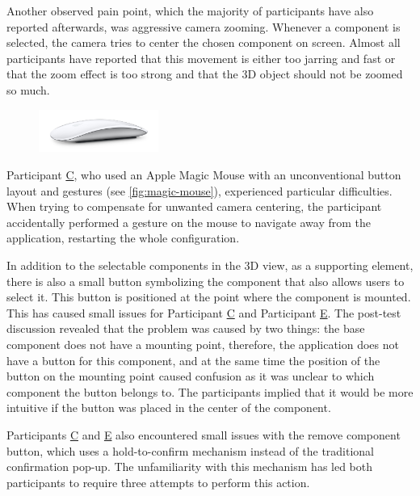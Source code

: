 Another observed pain point, which the majority of participants have also reported afterwards, was aggressive camera zooming. Whenever a component is selected, the camera tries to center the chosen component on screen. Almost all participants have reported that this movement is either too jarring and fast or that the zoom effect is too strong and that the 3D object should not be zoomed so much. 

\begin{figure}
    \centering
    \includegraphics[width=0.35\textwidth]{images/image_magicmouse.jpg}
    \label{fig:magic-mouse}
\end{figure}

Participant \hyperref[itm:C]{C}, who used an Apple Magic Mouse with an unconventional button layout and gestures (see \autoref{fig:magic-mouse}), experienced particular difficulties. When trying to compensate for unwanted camera centering, the participant accidentally performed a gesture on the mouse to navigate away from the application, restarting the whole configuration.

In addition to the selectable components in the 3D view, as a supporting element, there is also a small button symbolizing the component that also allows users to select it. This button is positioned at the point where the component is mounted. This has caused small issues for Participant \hyperref[itm:C]{C} and Participant \hyperref[itm:E]{E}. The post-test discussion revealed that the problem was caused by two things: the base component does not have a mounting point, therefore, the application does not have a button for this component, and at the same time the position of the button on the mounting point caused confusion as it was unclear to which component the button belongs to. The participants implied that it would be more intuitive if the button was placed in the center of the component.

Participants \hyperref[itm:C]{C} and \hyperref[itm:E]{E} also encountered small issues with the remove component button, which uses a hold-to-confirm mechanism instead of the traditional confirmation pop-up. The unfamiliarity with this mechanism has led both participants to require three attempts to perform this action. 

